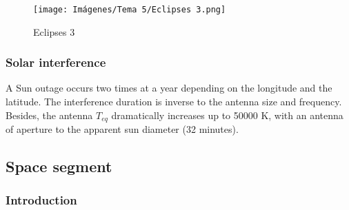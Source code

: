 \documentclass[
	12pt,
	twoside
]{book}
\begin{document}
\begin{figure}[H]
	\centering
	\texttt{[image: Imágenes/Tema 5/Eclipses 3.png]}
	\caption{
		\label{fig:unit5_Eclipses_3}
		Eclipses 3
	}
\end{figure}

\subsubsection{Solar interference}

A Sun outage occurs two times at a year depending on the longitude and the latitude. The interference duration is inverse to the antenna size and frequency. Besides, the antenna $T_{eq}$ dramatically increases up to 50000 K, with an antenna of aperture to the apparent sun diameter (32 minutes).

\subsection{Space segment}

\subsubsection{Introduction}
\end{document}
